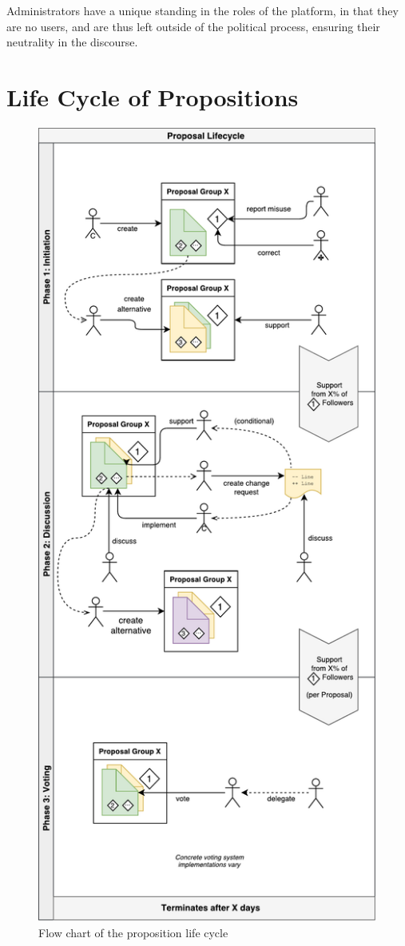 Administrators have a unique standing in the roles of the platform, in that they are no users, and are thus left outside of the political process, ensuring their neutrality in the discourse.

\section{Life Cycle of Propositions}
\label{sec:Model_Propositions}

\begin{figure}[t]
\centering
\includegraphics[height=0.6\paperheight]{img/lifecycle_flow_v0.pdf}
\caption{Flow chart of the proposition life cycle}
\label{fig:proplife}
\end{figure}

